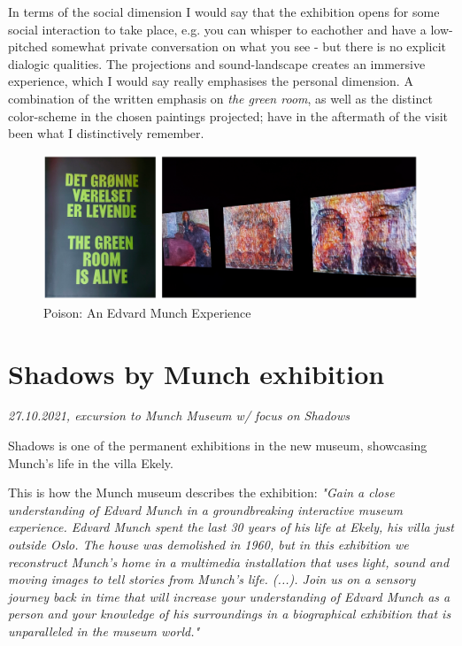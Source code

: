 In terms of the social dimension I would say that the exhibition opens for some social interaction to take place, e.g. you can whisper to eachother and have a low-pitched somewhat private conversation on what you see - but there is no explicit dialogic qualities. The projections and sound-landscape creates an immersive experience, which I would say really emphasises the personal dimension. A combination of the written emphasis on \emph{the green room}, as well as the distinct color-scheme in the chosen paintings projected; have in the aftermath of the visit been what I distinctively remember. 

\begin{figure}[H]
\includegraphics[width=12.5cm]{pictures/process/poison_alive.png}
\caption{Poison: An Edvard Munch Experience}
\centering 
\end{figure}


\section{Shadows by Munch exhibition}
\par
\emph{27.10.2021, excursion to Munch Museum w/ focus on Shadows}
\par

Shadows is one of the permanent exhibitions in the new museum, showcasing Munch's life in the villa Ekely.

This is how the Munch museum describes the exhibition: \emph{"Gain a close understanding of Edvard Munch in a groundbreaking interactive museum experience.
Edvard Munch spent the last 30 years of his life at Ekely, his villa just outside Oslo. The house was demolished in 1960, but in this exhibition we reconstruct Munch’s home in a multimedia installation that uses light, sound and moving images to tell stories from Munch’s life. (...). Join us on a sensory journey back in time that will increase your understanding of Edvard Munch as a person and your knowledge of his surroundings in a biographical exhibition that is unparalleled in the museum world."}


